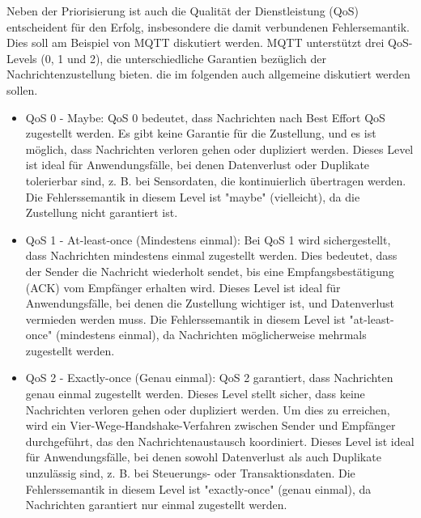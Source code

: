 Neben der Priorisierung ist auch die Qualität der Dienstleistung (QoS) entscheident für den Erfolg, insbesondere die damit verbundenen Fehlersemantik. Dies soll am Beispiel von MQTT diskutiert werden.
MQTT unterstützt drei QoS-Levels (0, 1 und 2), die unterschiedliche Garantien bezüglich der Nachrichtenzustellung bieten. die im folgenden auch allgemeine diskutiert werden sollen. 
\begin{itemize}
\item QoS 0 - Maybe: QoS 0 bedeutet, dass Nachrichten nach Best Effort QoS zugestellt werden. Es gibt keine Garantie für die Zustellung, und es ist möglich, dass Nachrichten verloren gehen oder dupliziert werden. Dieses Level ist ideal für Anwendungsfälle, bei denen Datenverlust oder Duplikate tolerierbar sind, z. B. bei Sensordaten, die kontinuierlich übertragen werden. Die Fehlerssemantik in diesem Level ist "maybe" (vielleicht), da die Zustellung nicht garantiert ist.
\item QoS 1 - At-least-once (Mindestens einmal):
Bei QoS 1 wird sichergestellt, dass Nachrichten mindestens einmal zugestellt werden. Dies bedeutet, dass der Sender die Nachricht wiederholt sendet, bis eine Empfangsbestätigung (ACK) vom Empfänger erhalten wird. Dieses Level ist ideal für Anwendungsfälle, bei denen die Zustellung wichtiger ist, und Datenverlust vermieden werden muss. Die Fehlerssemantik in diesem Level ist "at-least-once" (mindestens einmal), da Nachrichten möglicherweise mehrmals zugestellt werden.
\item QoS 2 - Exactly-once (Genau einmal):
QoS 2 garantiert, dass Nachrichten genau einmal zugestellt werden. Dieses Level stellt sicher, dass keine Nachrichten verloren gehen oder dupliziert werden. Um dies zu erreichen, wird ein Vier-Wege-Handshake-Verfahren zwischen Sender und Empfänger durchgeführt, das den Nachrichtenaustausch koordiniert. Dieses Level ist ideal für Anwendungsfälle, bei denen sowohl Datenverlust als auch Duplikate unzulässig sind, z. B. bei Steuerungs- oder Transaktionsdaten. Die Fehlerssemantik in diesem Level ist "exactly-once" (genau einmal), da Nachrichten garantiert nur einmal zugestellt werden.
\end{itemize}

